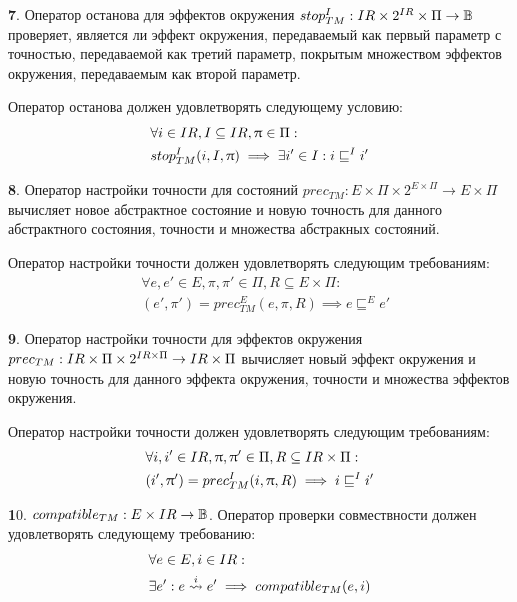{\textbf 7.} Оператор останова для эффектов окружения $stop^I_{TM}: IR \times 2^{IR} \times \Pi \rightarrow \mathbb{B}$ проверяет, является ли эффект окружения, передаваемый как первый параметр с точностью, передаваемой как третий параметр, покрытым множеством эффектов окружения, передаваемым как второй параметр.

Оператор останова должен удовлетворять следующему условию:
\begin{equation}
\label{cpa_stop_tm_i_eq}
\begin{aligned}
&\forall i \in IR, I \subseteq IR, \uppi \in \Pi:\\
&stop^I_{TM}(i, I, \uppi) \implies\exists i'\in I: i \sqsubseteq^I i'
\end{aligned}
\end{equation}

{\textbf 8.} Оператор настройки точности для состояний $prec_{TM}:E \times \Pi \times 2^{E \times \Pi} \rightarrow E \times \Pi$ вычисляет новое абстрактное состояние и новую точность для данного абстрактного состояния, точности и множества абстракных состояний.

Оператор настройки точности должен удовлетворять следующим требованиям:
\begin{equation}
\label{prec_tm_e_equation}
\begin{aligned}
& \forall e, e' \in E, \pi, \pi' \in \Pi, R \subseteq E \times \Pi:\\
& (e', \pi') = prec^E_{TM}(e, \pi, R) \implies e \sqsubseteq^E e'
\end{aligned}
\end{equation}

{\textbf 9.} Оператор настройки точности для эффектов окружения $prec_{TM}:IR \times \Pi \times 2^{IR \times \Pi} \rightarrow IR \times \Pi$ 
вычисляет новый эффект окружения и новую точность для данного эффекта окружения, точности и множества эффектов окружения.

Оператор настройки точности должен удовлетворять следующим требованиям:
\begin{equation}
\label{prec_tm_i_equation}
\begin{aligned}
& \forall i, i' \in IR, \uppi, \uppi' \in \Pi, R \subseteq IR \times \Pi:\\
& (i', \uppi') = prec^I_{TM}(i, \uppi, R) \implies i \sqsubseteq^I i'
\end{aligned}
\end{equation}

{\textbf 10.} $compatible_{TM}: E \times IR \to \mathbb{B}$.
Оператор проверки совмествности должен удовлетворять следующему требованию:
\begin{equation}
\label{compatible_tm_equation}
\begin{aligned}
& \forall e \in E, i \in IR:\\
& \exists e': e \stackrel{i}{\leadsto} e' \implies compatible_{TM}(e,i)
\end{aligned}
\end{equation}

